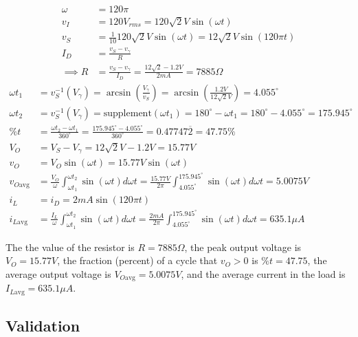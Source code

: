 \documentclass[12pt,letterpaper,titlepage]{article}
\begin{document}
\begin{raggedright}
\begin{align}
    \omega 
    	&= 120\pi
\\  v_I 
    	&= 120 V_{rms} 
         = 120\sqrt{2} V \sin(\omega t)
\\  v_S 
		&= \frac{1}{10}120\sqrt{2} V \sin(\omega t)
	     = 12\sqrt{2} V \sin(120\pi t)
\\  I_D
	    &= \frac{v_S - v_\gamma}{R}
\\ \implies R
		&= \frac{v_S - v_\gamma}{I_D}
		 = \frac{12\sqrt{2} - 1.2V}{2mA}
		 = 7885\Omega
\end{align}
\begin{align}
    \omega t_1 
	  &= v_S^{-1}(V_\gamma) 
	   = \arcsin(\frac{V_\gamma}{v_S}) 
	   = \arcsin(\frac{1.2V}{12\sqrt{2}V}) 
	   = 4.055^\circ 
\\	\omega t_2
      &= v_S^{-1}(V_\gamma)
	   = \text{supplement}(\omega t_1)
	   = 180^\circ - \omega t_1
       = 180^\circ - 4.055^\circ
       = 175.945^\circ
\\  \% t
	  &= \frac{\omega t_2 - \omega t_1}{360^\circ} 
	   = \frac{175.945^\circ - 4.055^\circ}{360^\circ}
	   = 0.47747\overline{2}
	   = 47.75\%
\\  V_O 
      &= V_S - V_\gamma
       = 12\sqrt{2}V - 1.2V
       = 15.77V
\\  v_O 
      &= V_O \sin(\omega t)
       = 15.77V \sin(\omega t)
\\  v_{O \text{avg}}
      &= \frac{V_O}{\omega} \int_{\omega t_1}^{\omega t_2} \sin(\omega t) d\omega t
       = \frac{15.77V}{2\pi} \int_{4.055^\circ}^{175.945^\circ} \sin(\omega t) d\omega t
       = 5.0075 V
\\  i_L
      &= i_D
       = 2 mA \sin(120\pi t)
\\  i_{L \text{avg}}
      &= \frac{I_L}{\omega} \int_{\omega t_1}^{\omega t_2} \sin(\omega t) d\omega t
       = \frac{2mA}{2\pi} \int_{4.055^\circ}^{175.945^\circ} \sin(\omega t) d\omega t
       = 635.1 \mu A
\end{align}

The the value of the resistor is $R = 7885\Omega$,
 the peak output voltage is $V_O = 15.77V$,
 the fraction (percent) of a cycle that $v_O > 0$ is $\%t = 47.75$,
 the average output voltage is $V_{O \text{avg}} = 5.0075 V$, and
 the average current in the load is $I_{L \text{avg}} = 635.1 \mu A$.

\clearpage
\subsection{Validation}


\end{raggedright}
\end{document}
